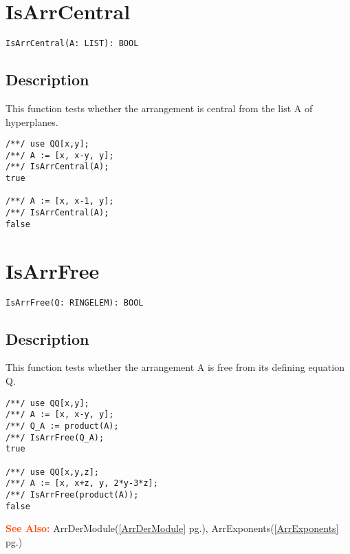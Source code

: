 \documentclass[a4paper]{mybook}
\newenvironment{command}{}{} %
\newcommand\SeeAlso{\par\textcolor{OrangeRed}{\textbf{\large See Also: }}}
\begin{document}
\section{IsArrCentral}
\label{IsArrCentral}
\begin{command} %


\begin{Verbatim}[label=syntax, rulecolor=\color{MidnightBlue},
frame=single]
IsArrCentral(A: LIST): BOOL 
\end{Verbatim}


\subsection*{Description}

This function tests whether the arrangement is central from the list A of hyperplanes.
\begin{Verbatim}[label=example, rulecolor=\color{PineGreen}, frame=single]
/**/ use QQ[x,y];	
/**/ A := [x, x-y, y];
/**/ IsArrCentral(A);
true

/**/ A := [x, x-1, y];
/**/ IsArrCentral(A);
false
\end{Verbatim}


\end{command} %

\section{IsArrFree}
\label{IsArrFree}
\begin{command} %


\begin{Verbatim}[label=syntax, rulecolor=\color{MidnightBlue},
frame=single]
IsArrFree(Q: RINGELEM): BOOL 
\end{Verbatim}


\subsection*{Description}

This function tests whether the arrangement A is free from its defining equation Q.
\begin{Verbatim}[label=example, rulecolor=\color{PineGreen}, frame=single]
/**/ use QQ[x,y];	
/**/ A := [x, x-y, y];
/**/ Q_A := product(A);
/**/ IsArrFree(Q_A);    
true

/**/ use QQ[x,y,z];    
/**/ A := [x, x+z, y, 2*y-3*z];
/**/ IsArrFree(product(A));
false
\end{Verbatim}


\SeeAlso %
  ArrDerModule(\ref{ArrDerModule} pg.\pageref{ArrDerModule}), 
    ArrExponents(\ref{ArrExponents} pg.\pageref{ArrExponents})
\end{command} %
\end{document}
